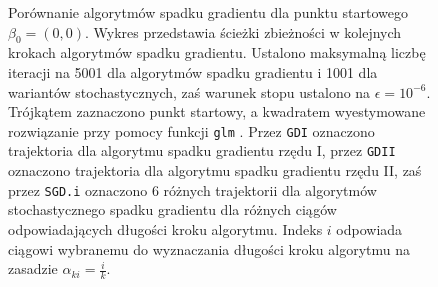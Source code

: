 \begin{figure}[h!]
  \caption[Porównanie algorytmów spadku gradientu dla punktu startowego $\beta_0 = (0,0)$.]{\label{fig:scasd}Porównanie algorytmów spadku gradientu dla punktu startowego $\beta_0 = (0,0)$. Wykres przedstawia ścieżki zbieżności w kolejnych krokach algorytmów spadku gradientu. Ustalono maksymalną liczbę iteracji na 5001 dla algorytmów spadku gradientu i 1001 dla wariantów stochastycznych, zaś warunek stopu ustalono na $\epsilon=10^{-6}$. Trójkątem zaznaczono punkt startowy, a kwadratem wyestymowane rozwiązanie przy pomocy funkcji \texttt{glm} \cite{glmglm}. Przez \texttt{GDI} oznaczono trajektoria dla algorytmu spadku gradientu rzędu I, przez \texttt{GDII} oznaczono trajektoria dla algorytmu spadku gradientu rzędu II, zaś przez \texttt{SGD.i} oznaczono 6 różnych trajektorii dla algorytmów stochastycznego spadku gradientu dla różnych ciągów odpowiadających długości kroku algorytmu. Indeks $i$ odpowiada ciągowi wybranemu do wyznaczania długości kroku algorytmu na zasadzie $\alpha_{ki} = \frac{i}{k}$.}
\end{figure}


